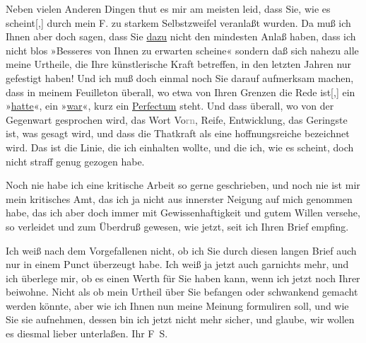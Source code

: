 \pstart
           Neben vielen Anderen Dingen thut es mir am meisten leid, dass Sie, wie es
                  scheint{[},{]} durch mein F. zu starkem Selbstzweifel veranlaßt wurden. Da muß ich
               Ihnen aber doch sagen, dass Sie \uline{dazu} nicht den
               mindesten Anlaß haben, dass ich nicht blos »Besseres von Ihnen zu erwarten scheine«
               sondern daß sich nahezu alle meine Urtheile, die Ihre künstlerische Kraft betreffen,
               in den letzten Jahren nur gefestigt haben! Und ich muß {\pb}doch einmal noch Sie darauf
               aufmerksam machen, dass in meinem Feuilleton überall, wo etwa von Ihren Grenzen die Rede
                  ist{[},{]} ein »\uline{hatte}«, ein »\uline{war}«, kurz ein \uline{Perfectum} steht. Und dass überall, wo von der Gegenwart gesprochen wird, das
               Wort Vo\textcolor{gray}{rn}, Reife, Entwicklung, das Geringste ist, was gesagt wird,
               und dass die Thatkraft als eine hoffnungsreiche bezeichnet wird. Das ist die Linie,
               die ich einhalten wollte, und die ich, wie es scheint, doch nicht straff genug
               gezogen habe.\pend
           
\pstart
           Noch nie habe ich eine kritische Arbeit so gerne geschrieben, und noch nie ist mir
               mein kritisches Amt, das ich ja nicht aus innerster Neigung auf mich genommen habe,
               das ich aber doch immer mit Gewissenhaftigkeit und gutem Willen versehe, so verleidet
               und zum Überdruß gewesen, wie jetzt, seit ich Ihren Brief empfing.\pend
           
\pstart
           Ich weiß nach dem Vorgefallenen nicht, ob ich Sie durch diesen langen Brief auch nur
               in einem Punct überzeugt habe. Ich weiß ja jetzt auch garnichts mehr, und ich
               überlege mir, ob es einen Werth für Sie haben kann, wenn ich jetzt noch Ihrer \label{K_L03353-10v}\label{K_L03353-10} beiwohne. Nicht als ob mein Urtheil über Sie befangen oder schwankend gemacht
               werden könnte, aber wie ich Ihnen nun meine Meinung formuliren soll, und wie Sie sie
               aufnehmen, dessen bin ich jetzt nicht mehr sicher, und glaube, wir wollen es diesmal
               lieber unterlaßen.\pend
           \pstart Ihr \spacefill\mbox{F S.}\pend{}\endnumbering{}  \newcommand{\dateiname}{L03353}\newcommand{\titel}{Felix Salten an Arthur Schnitzler, [9. 11. 1903]}\newcommand{\editorInnen}{Martin Anton Müller und Laura Untner}
